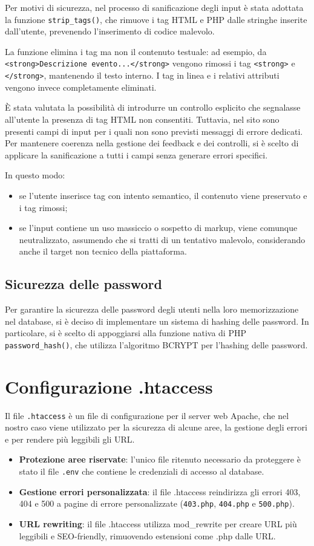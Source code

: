 \documentclass[a4paper,12pt]{article}
\begin{document}
Per motivi di sicurezza, nel processo di sanificazione degli input è stata adottata la funzione \texttt{strip\_tags()}, che rimuove i tag HTML e PHP dalle stringhe inserite dall’utente, prevenendo l’inserimento di codice malevolo.  

La funzione elimina i tag ma non il contenuto testuale: ad esempio, da \texttt{<strong>Descrizione evento...</strong>} vengono rimossi i tag \texttt{<strong>} e \texttt{</strong>}, mantenendo il testo interno. I tag in linea e i relativi attributi vengono invece completamente eliminati.

È stata valutata la possibilità di introdurre un controllo esplicito che segnalasse all’utente la presenza di tag HTML non consentiti. Tuttavia, nel sito sono presenti campi di input per i quali non sono previsti messaggi di errore dedicati.  
Per mantenere coerenza nella gestione dei feedback e dei controlli, si è scelto di applicare la sanificazione a tutti i campi senza generare errori specifici.

In questo modo:
\begin{itemize}
    \item se l’utente inserisce tag con intento semantico, il contenuto viene preservato e i tag rimossi;
    \item se l’input contiene un uso massiccio o sospetto di markup, viene comunque neutralizzato, assumendo che si tratti di un tentativo malevolo, considerando anche il target non tecnico della piattaforma.
\end{itemize}

\subsection{Sicurezza delle password}
Per garantire la sicurezza delle password degli utenti nella loro memorizzazione nel database, si è deciso di implementare un sistema di hashing delle password.
In particolare, si è scelto di appoggiarsi alla funzione nativa di PHP \texttt{password\_hash()}, che utilizza l'algoritmo BCRYPT per l'hashing delle password.

\section{Configurazione .htaccess} 
Il file \texttt{.htaccess} è un file di configurazione per il server web Apache, che nel nostro caso viene utilizzato per la sicurezza di alcune aree,
la gestione degli errori e per rendere più leggibili gli URL.
\begin{itemize}
    \item \textbf{Protezione aree riservate}: l'unico file ritenuto necessario da proteggere è stato il file \texttt{.env} che contiene le credenziali di accesso al database.
    \item \textbf{Gestione errori personalizzata}: il file .htaccess reindirizza gli errori 403, 404 e 500 a pagine di errore personalizzate (\texttt{403.php}, \texttt{404.php} e \texttt{500.php}).
    \item \textbf{URL rewriting}: il file .htaccess utilizza mod\_rewrite per creare URL più leggibili e SEO-friendly, rimuovendo estensioni come .php dalle URL.
\end{itemize}
\end{document}

